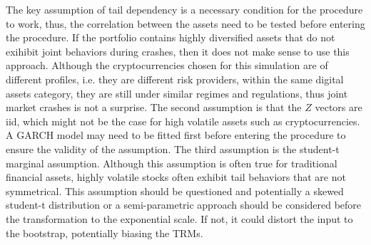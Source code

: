 \documentclass[a4paper,11pt]{article}
\begin{document}
The key assumption of tail dependency is a necessary condition for the procedure to work, thus, the correlation between the assets need to be tested before entering the procedure.
If the portfolio contains highly diversified assets that do not exihibit joint behaviors during crashes, then it does not make sense to use this approach.
Although the cryptocurrencies chosen for this simulation are of different profiles, i.e. they are different risk providers, within the same digital assets category, they are still under similar regimes and regulations, thus joint market crashes is not a surprise.
The second assumption is that the $Z$ vectors are iid, which might not be the case for high volatile assets such as cryptocurrencies.
A GARCH model may need to be fitted first before entering the procedure to ensure the validity of the assumption.
The third assumption is the student-t marginal assumption.
Although this assumption is often true for traditional financial assets, highly volatile stocks often exhibit tail behaviors that are not symmetrical.
This assumption should be questioned and potentially a skewed student-t distribution or a semi-parametric approach should be considered before the transformation to the exponential scale.
If not, it could distort the input to the bootstrap, potentially biasing the TRMs.

\newpage

\printbibliography
%
%
\end{document}
